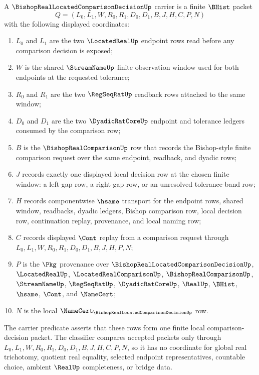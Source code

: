 \begin{definition}
\label{def:bishop-real-located-comparison-decision-carrier}
A $\BishopRealLocatedComparisonDecisionUp$ carrier is a finite $\BHist$ packet
$$
Q=(L_0,L_1,W,R_0,R_1,D_0,D_1,B,J,H,C,P,N)
$$
with the following displayed coordinates:
\begin{enumerate}
\item $L_0$ and $L_1$ are the two $\LocatedRealUp$ endpoint rows read before any comparison decision is exposed;
\item $W$ is the shared $\StreamNameUp$ finite observation window used for both endpoints at the requested tolerance;
\item $R_0$ and $R_1$ are the two $\RegSeqRatUp$ readback rows attached to the same window;
\item $D_0$ and $D_1$ are the two $\DyadicRatCoreUp$ endpoint and tolerance ledgers consumed by the comparison row;
\item $B$ is the $\BishopRealComparisonUp$ row that records the Bishop-style finite comparison request over the same endpoint, readback, and dyadic rows;
\item $J$ records exactly one displayed local decision row at the chosen finite window: a left-gap row, a right-gap row, or an unresolved tolerance-band row;
\item $H$ records componentwise $\hsame$ transport for the endpoint rows, shared window, readbacks, dyadic ledgers, Bishop comparison row, local decision row, continuation replay, provenance, and local naming row;
\item $C$ records displayed $\Cont$ replay from a comparison request through $L_0,L_1,W,R_0,R_1,D_0,D_1,B,J,H,P,N$;
\item $P$ is the $\Pkg$ provenance over $\BishopRealLocatedComparisonDecisionUp$, $\LocatedRealUp$, $\LocatedRealComparisonUp$, $\BishopRealComparisonUp$, $\StreamNameUp$, $\RegSeqRatUp$, $\DyadicRatCoreUp$, $\RealUp$, $\BHist$, $\hsame$, $\Cont$, and $\NameCert$;
\item $N$ is the local $\NameCert_{\BishopRealLocatedComparisonDecisionUp}$ row.
\end{enumerate}
The carrier predicate asserts that these rows form one finite local comparison-decision packet. The classifier compares accepted packets only through $L_0,L_1,W,R_0,R_1,D_0,D_1,B,J,H,C,P,N$, so it has no coordinate for global real trichotomy, quotient real equality, selected endpoint representatives, countable choice, ambient $\RealUp$ completeness, or bridge data.
\end{definition}

